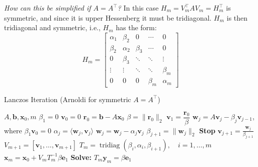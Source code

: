 \documentclass[../../main.tex]{subfiles}
\begin{document}
\textit{How can this be simplified if $A = A^\top$?}
In this case $H_m = V_m^\top A V_m = H_m^\top$ is symmetric, and since it is upper Hessenberg it must be tridiagonal.
$H_m$ is then tridiagonal and symmetric, i.e., $H_m$ has the form:
\[
  H_m =
  \begin{bmatrix}
    \alpha_1 & \beta_2  & 0       & \cdots  & 0        \\
    \beta_2  & \alpha_2 & \beta_3 & \cdots  & 0        \\
    0        & \beta_3  & \ddots  & \ddots  & \vdots   \\
    \vdots   & \vdots   & \ddots  & \ddots  & \beta_m  \\
    0        & 0        & 0       & \beta_m & \alpha_m
  \end{bmatrix}
\]

\begin{algorithm}[htbp]
  \caption{Lanczos Iteration (Arnoldi for symmetric $A=A^\top$)}
  \label{alg:lanczos}
  \begin{algorithmic}[0]
    \Require $A, \mathbf{b}, \mathbf{x}_0, m$
    \State $\beta_1 = 0$
    \State $\mathbf{v}_0 = 0$
    \State $\mathbf{r}_0 = \mathbf{b} - A\mathbf{x}_0$
    \State $\beta = \|\mathbf{r}_0\|_2$
    \State $\mathbf{v}_1 = \dfrac{\mathbf{r}_0}{\beta}$
    \State $\mathbf{w}_j = A\mathbf{v}_j - \beta_j \mathbf{v}_{j-1}$, where $\beta_1 \mathbf{v}_0 = 0$
    \State $\alpha_j = \langle \mathbf{w}_j, \mathbf{v}_j \rangle$
    \State $\mathbf{w}_j = \mathbf{w}_j - \alpha_j \mathbf{v}_j$
    \State $\beta_{j+1} = \|\mathbf{w}_j\|_2$
     \textbf{Stop}
    \EndIf
    \State $\mathbf{v}_{j+1} = \frac{\mathbf{w}_j}{\beta_{j+1}}$
    \EndFor
    \Return $V_{m+1} = [\mathbf{v}_1, \ldots, \mathbf{v}_{m+1}]$
    \State $T_m = \operatorname{tridiag}(\beta_i, \alpha_i, \beta_{i+1}), \quad i=1,\ldots,m$
    \State $\mathbf{x}_m = \mathbf{x}_0 + V_m T_m^{-1} \beta \mathbf{e}_1$
    \State \textbf{Solve:} $T_m \mathbf{y}_m = \beta \mathbf{e}_1$
  \end{algorithmic}
\end{algorithm}
\end{document}
